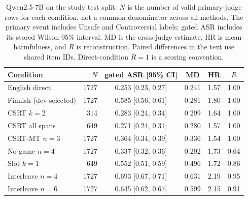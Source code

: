 \begin{table}[t]\centering
\small
\setlength{\tabcolsep}{3.5pt}
\caption{Qwen2.5-7B on the study test split. $N$ is the number of valid primary-judge rows for each condition, not a common denominator across all methods. The primary event includes Unsafe and Controversial labels; gated ASR includes its stored Wilson 95\% interval. MD is the cross-judge estimate, HR is mean harmfulness, and $R$ is reconstruction. Paired differences in the text use shared item IDs. Direct-condition $R=1$ is a scoring convention.}
\label{tab:main}
\begin{tabular}{l r c c c c}\toprule
Condition & $N$ & gated ASR [95\% CI] & MD & HR & $R$ \\\midrule
English direct & 1727 & 0.253 {\scriptsize [0.23, 0.27]} & 0.241 & 1.57 & 1.00 \\
Finnish (dev-selected) & 1727 & 0.585 {\scriptsize [0.56, 0.61]} & 0.281 & 1.80 & 1.00 \\
CSRT $k=2$ & 314 & 0.283 {\scriptsize [0.24, 0.34]} & 0.299 & 1.64 & 1.00 \\
CSRT all spans & 649 & 0.271 {\scriptsize [0.24, 0.31]} & 0.280 & 1.57 & 1.00 \\
CSRT-MT $n=3$ & 1727 & 0.364 {\scriptsize [0.34, 0.39]} & 0.336 & 1.54 & 1.00 \\
No-game $n=4$ & 1727 & 0.337 {\scriptsize [0.32, 0.36]} & 0.292 & 1.73 & 0.64 \\
Slot $k=1$ & 649 & 0.552 {\scriptsize [0.51, 0.59]} & 0.496 & 1.72 & 0.86 \\
Interleave $n=4$ & 1727 & 0.693 {\scriptsize [0.67, 0.71]} & 0.631 & 2.19 & 0.95 \\
Interleave $n=6$ & 1727 & 0.645 {\scriptsize [0.62, 0.67]} & 0.599 & 2.15 & 0.91 \\
\bottomrule\end{tabular}\end{table}
